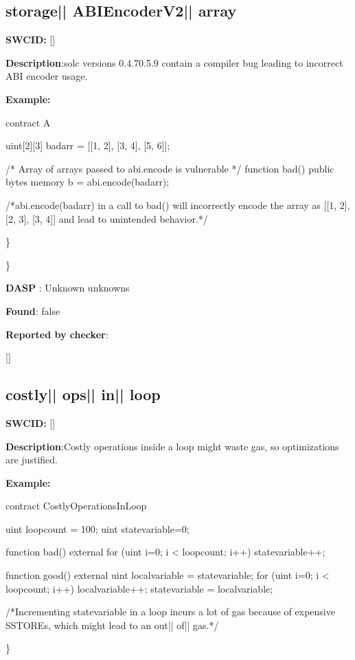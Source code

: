 \documentclass{article}
\begin{document}
\subsection{storage{|\textunderscore| }ABIEncoderV2{|\textunderscore| }array} 
\textbf{SWC{\textunderscore }ID:} []

\textbf{Description}:solc versions 0.4.7{\textendash}0.5.9 contain a compiler bug leading to incorrect ABI encoder usage.


\textbf{Example:} 
\begin{ffcode} 

contract A {
    uint[2][3] bad\textunderscore arr = [[1, 2], [3, 4], [5, 6]];

    /* Array of arrays passed to abi.encode is vulnerable */
    function bad() public {
        bytes memory b = abi.encode(bad\textunderscore arr);
    }
}

 /*abi.encode(bad\textunderscore arr) in a call to bad() will incorrectly encode the array as [[1, 2], [2, 3], [3, 4]] and lead to unintended behavior.*/ 

\end{ffcode} 
\} 

\} 

\textbf{DASP} : Unknown unknowns

\textbf{Found}: false

\textbf{Reported by checker}: 
\begin{ffcode} 

[]
\end{ffcode} 
\subsection{costly{|\textunderscore| }ops{|\textunderscore| }in{|\textunderscore| }loop} 
\textbf{SWC{\textunderscore }ID:} []

\textbf{Description}:Costly operations inside a loop might waste gas, so optimizations are justified.


\textbf{Example:} 
\begin{ffcode} 

contract CostlyOperationsInLoop{

    uint loop\textunderscore count = 100;
    uint state\textunderscore variable=0;

    function bad() external{
        for (uint i=0; i < loop\textunderscore count; i++){
            state\textunderscore variable++;
        }
    }

    function good() external{
      uint local\textunderscore variable = state\textunderscore variable;
      for (uint i=0; i < loop\textunderscore count; i++){
        local\textunderscore variable++;
      }
      state\textunderscore variable = local\textunderscore variable;
    }
}
 /*Incrementing state\textunderscore variable in a loop incurs a lot of gas because of expensive SSTOREs, which might lead to an out|\textendash| of|\textendash| gas.*/ 

\end{ffcode} 
\} 
\end{document}
